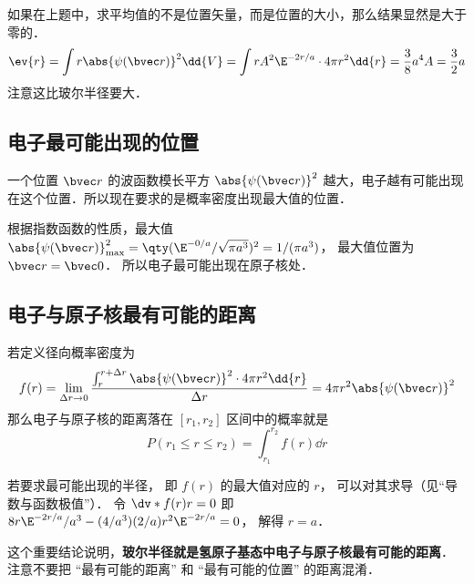 如果在上题中，求平均值的不是位置矢量，而是位置的大小，那么结果显然是大于零的．
\begin{equation}
\ev{r} = \int r \abs{\psi (\bvec r)}^2 \dd{V} = \int r A^2 \E^{-2r/a} \cdot 4\pi r^2 \dd{r} = \frac{3}{8} a^4 A = \frac{3}{2}a
\end{equation}
注意这比玻尔半径要大．

\subsection{电子最可能出现的位置}

一个位置 $\bvec r$ 的波函数模长平方 $\abs{\psi(\bvec r)}^2$ 越大，电子越有可能出现在这个位置．所以现在要求的是概率密度出现最大值的位置．
 
根据指数函数的性质，最大值 $\abs{\psi (\bvec r)}_{\max}^2 = \qty( \E^{-0/a}/\sqrt{\pi a^3})^2 = 1/(\pi a^3)$， 最大值位置为 $\bvec r = \bvec 0$． 所以电子最可能出现在原子核处．

\subsection{电子与原子核最有可能的距离}
若定义径向概率密度为
\begin{equation}\label{HWF0_eq1}
f(r) = \lim_{\Delta r \to 0} \frac{\int_r^{r + \Delta r} {\abs{\psi (\bvec r)}}^2 \cdot 4\pi r^2 \dd{r} }{\Delta r} = 4\pi r^2 \abs{\psi(\bvec r)}^2
\end{equation}
那么电子与原子核的距离落在 $[r_1, r_2]$ 区间中的概率就是
\begin{equation}
P(r_1 \le r \le r_2) = \int_{r_1}^{r_2} f(r) \dd{r}
\end{equation}

若要求最可能出现的半径， 即 $f(r)$ 的最大值对应的 $r$， 可以对其求导（见“导数与函数极值”）． 令 $\dv*{f(r)}{r} = 0$ 即 $8 r \E^{-2r/a}/a^3 - (4/a^3)(2/a)r^2 \E^{-2r/a} = 0$， 解得 $r = a$． 
 
这个重要结论说明，\textbf{玻尔半径就是氢原子基态中电子与原子核最有可能的距离}． 注意不要把 “最有可能的距离” 和 “最有可能的位置” 的距离混淆．
